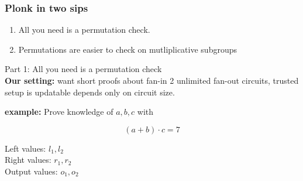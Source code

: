 \documentclass[shadesubsections,trans,14pt,mathserif]{beamer}
\newcommand{\F}{\ensuremath{\mathbb F}}
\newcommand{\polysofdeg}[1]{\F_{< #1}[X]}
\begin{document}
\begin{frame}
\frametitle{Plonk in two sips}   %
 
  \begin{enumerate}

\item All you need is a permutation check.
 \item Permutations are easier to check on mutliplicative subgroups
\end{enumerate}


\end{frame}


\begin{frame}
\large{Part 1: All you need is a permutation check}\\
 \vspace{0.2in}
\normalsize{\textbf{Our setting:} want short proofs about fan-in 2 unlimited fan-out circuits, trusted setup is updatable depends only on circuit size.}
\end{frame}




\begin{frame}
\textbf{example:} Prove knowledge of $a,b,c$ with
 
 
 
 
 
\[(a+b)\cdot c =7\]




\end{frame}


\begin{frame}
Left values: 
$l_1,l_2$\\
Right values: $r_1,r_2$\\
Output values:
$o_1,o_2$


 \vspace{0.2in}

\end{frame}
\end{document}
